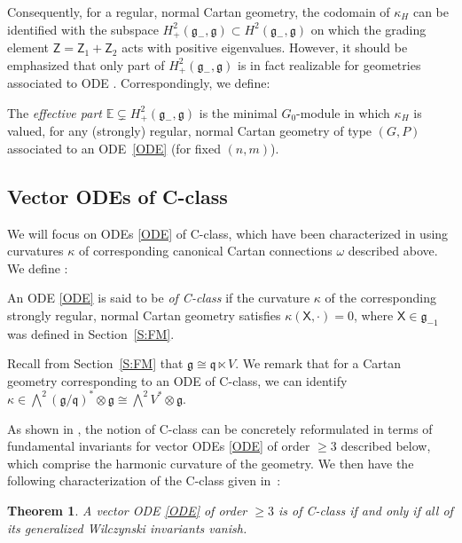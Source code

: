 \documentclass[pdftex]{sigma}%
\newcommand\tensor{\otimes}
\newcommand{\g}{\mathfrak{g}}
\newcommand\fg{\mathfrak{g}}
\newcommand\fq {\mathfrak{q}}
\newcommand\bbE{\mathbb{E}}
\newcommand\sfX{\mathsf{X}}
\newcommand\sfZ{\mathsf{Z}}
\numberwithin{equation}{section}
\newtheorem{Theorem}{Theorem}[section]
\begin{document}
Consequently, for a regular, normal Cartan geometry, the codomain of $\kappa_H$ can be identified with the subspace $H^2_+(\g_-,\g) \subset H^2(\fg_-,\fg)$ on which the grading element $\sfZ = \sfZ_1 + \sfZ_2$ acts with positive eigenvalues. However, it should be emphasized that only part of $H^2_+(\g_-,\g)$ is in fact realizable for geometries associated to ODE \cite{DM2014, Medvedev2010}. Correspondingly, we define:

\begin{Definition}\label{D:E} The {\em effective part} $\bbE \subsetneq H^2_+(\g_{-},\g)$ is the minimal $G_{0}$-module in which $\kappa_H$ is valued, for any (strongly) regular, normal Cartan geometry of type $(G, P)$ associated to an ODE~\eqref{ODE} (for fixed $(n,m)$).
\end{Definition}


\subsection{Vector ODEs of C-class} \label{S: C-class}

We will focus on ODEs \eqref{ODE} of C-class, which have been characterized in \cite{CDT2020} using curvatures $\kappa$ of corresponding canonical Cartan connections $\omega$ described above. We define \cite[Definition~2.4]{CDT2020}:
\begin{Definition} \label{D:C-class}
An ODE \eqref{ODE} is said to be {\em of C-class} if the curvature $\kappa$ of the corresponding strongly regular, normal Cartan geometry satisfies $\kappa(\sfX,\cdot) = 0$, where $\sfX \in \g_{-1}$ was defined in Section~\ref{S:FM}.
\end{Definition}

\begin{Remark}\label{R:kC-class}
Recall from Section~\ref{S:FM} that $\g \cong \fq \ltimes V$. We remark that for a Cartan geometry corresponding to an ODE of C-class, we can identify $\kappa \in \bigwedge^2 (\g / \fq)^*\otimes \fg \cong \bigwedge^2 V^\ast \tensor \g$.
\end{Remark}


As shown in \cite{CDT2020}, the notion of C-class can be concretely reformulated in terms of fundamental invariants for vector ODEs \eqref{ODE} of order $\ge 3$ described below, which comprise the harmonic curvature of the geometry. We then have the following characterization of the C-class given in~\cite[Theorems~4.1 and~4.2]{CDT2020}:
\begin{Theorem} A vector ODE \eqref{ODE} of order $\geq 3$ is of C-class if and only if all of its generalized Wilczynski invariants vanish.
\end{Theorem}
\end{document}
